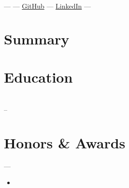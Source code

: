 \documentclass[10pt,a4paper]{article}
\providecommand{\VAR}[1]{}
\providecommand{\BLOCK}[1]{}
\begin{document}
\pagestyle{empty}

\begin{center}
    {\huge \textbf{\VAR{name}}} \\ \vspace{4pt}
    \VAR{phone} --- \href{mailto:\VAR{email}}{\VAR{email}} --- \href{\VAR{github}}{GitHub} --- \href{\VAR{linkedin}}{LinkedIn} --- \VAR{location}
\end{center}
\vspace{2pt}

\BLOCK{for section_name in section_order}

\BLOCK{if section_name == 'summary' and summary}
\section*{Summary}
\VAR{summary}
\vspace{2pt}

\BLOCK{elif section_name == 'education' and education and education|length > 0}
\section*{Education}
\BLOCK{for edu in education}
\noindent \textbf{\VAR{edu.institution}} \hfill \VAR{edu.location} \\
\textit{\VAR{edu.degree}} \hfill \VAR{edu.start_date} -- \VAR{edu.end_date or 'Present'}
\vspace{2pt}
\BLOCK{endfor}

\BLOCK{elif section_name == 'awards' and awards and awards|length > 0}
\section*{Honors \& Awards}
\BLOCK{for award in awards}
\noindent \textbf{\VAR{award.title}} --- \textit{\VAR{award.event}} \hfill \VAR{award.year}
\BLOCK{if award.bullets and award.bullets|length > 0}
\begin{itemize}[leftmargin=1.5em, itemsep=1pt, parsep=0pt, topsep=2pt]
    \BLOCK{for bullet in award.bullets}
    \item \VAR{bullet.text}
    \BLOCK{endfor}
\end{itemize}
\BLOCK{endif}
\vspace{2pt}
\BLOCK{endfor}

\BLOCK{elif section_name == 'experience' and experience and experience|length > 0}
\end{document}
